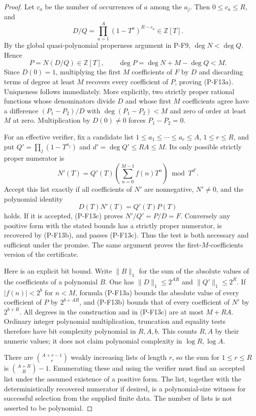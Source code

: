 \documentclass[11pt,a4paper]{article}
\begin{document}
\begin{proof}
Let $c_a$ be the number of occurrences of $a$ among the $a_j$.
Then $0\le c_a\le R$, and
\[
 D/Q=\prod_{a=1}^{A}(1-T^a)^{R-c_a}\in\mathbb Z[T].
\]
By the global quasi-polynomial properness argument in P-F9,
$\deg N<\deg Q$. Hence
\[
 P=N(D/Q)\in\mathbb Z[T],\qquad
 \deg P=\deg N+M-\deg Q<M.
\]
Since $D(0)=1$, multiplying the first $M$ coefficients of $F$ by $D$
and discarding terms of degree at least $M$ recovers every coefficient
of $P$, proving (P-F13a). Uniqueness follows immediately. More
explicitly, two strictly proper rational functions whose denominators
divide $D$ and whose first $M$ coefficients agree have a difference
$(P_1-P_2)/D$ with $\deg(P_1-P_2)<M$ and zero of order at least $M$
at zero. Multiplication by $D(0)\ne0$ forces $P_1-P_2=0$.

For an effective verifier, fix a candidate list
$1\le a_1\le\cdots\le a_r\le A$, $1\le r\le R$, and put
$Q'=\prod_j(1-T^{a_j})$ and $d'=\deg Q'\le RA\le M$.
Its only possible strictly proper numerator is
\[
 N'(T)=Q'(T)\left(\sum_{n=0}^{M-1}f(n)T^n\right)\bmod T^{d'}.
 \tag{P-F13b}
\]
Accept this list exactly if all coefficients of $N'$ are nonnegative,
$N'\ne0$, and the polynomial identity
\[
 D(T)N'(T)=Q'(T)P(T)
 \tag{P-F13c}
\]
holds. If it is accepted, (P-F13c) proves $N'/Q'=P/D=F$.
Conversely any positive form with the stated bounds has a strictly
proper numerator, is recovered by (P-F13b), and passes (P-F13c).
Thus the test is both necessary and sufficient under the promise.
The same argument proves the first-$M$-coefficients version of the
certificate.

Here is an explicit bit bound. Write $\|B\|_1$ for the sum of the
absolute values of the coefficients of a polynomial $B$. One has
$\|D\|_1\le2^{AR}$ and $\|Q'\|_1\le2^R$. If
$|f(n)|<2^b$ for $n<M$, formula (P-F13a) bounds the absolute value
of every coefficient of $P$ by $2^{b+AR}$, and (P-F13b) bounds that
of every coefficient of $N'$ by $2^{b+R}$. All degrees in the
construction and in (P-F13c) are at most $M+RA$. Ordinary integer
polynomial multiplication, truncation and equality tests therefore
have bit complexity polynomial in $R,A,b$. This counts $R,A$ by
their numeric values; it does not claim polynomial complexity in
$\log R,\log A$.

There are $\binom{A+r-1}{r}$ weakly increasing lists of length $r$,
so the sum for $1\le r\le R$ is $\binom{A+R}{R}-1$.
Enumerating these and using the verifier must find an accepted list
under the assumed existence of a positive form. The list, together
with the deterministically recovered numerator if desired, is a
polynomial-size witness for successful selection from the supplied
finite data. The number of lists is not asserted to be polynomial.
\end{proof}
\end{document}
